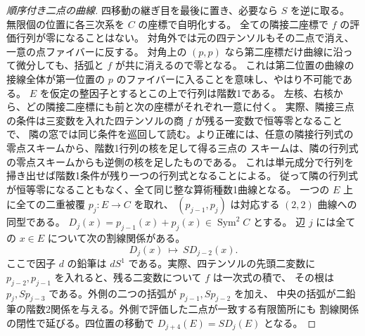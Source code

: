 \begin{proof}[順序付き二点の曲線]
四移動の継ぎ目を最後に置き、必要なら $S$ を逆に取る。
無限個の位置に各三次系を $C$ の座標で自明化する。
全ての隣接二座標で $f$ の評価行列が零になることはない。
対角外では元の四テンソルもその二点で消え、一意の点ファイバーに反する。
対角上の $(p,p)$ なら第二座標だけ曲線に沿って微分しても、括弧と $f$ が共に消えるので零となる。
これは第二位置の曲線の接線全体が第一位置の $p$ のファイバーに入ることを意味し、やはり不可能である。
$E$ を仮定の整因子とするとこの上で行列は階数1である。
左核、右核から、どの隣接二座標にも前と次の座標がそれぞれ一意に付く。
実際、隣接三点の条件は三変数を入れた四テンソルの商 $f$ が残る一変数で恒等零となることで、
隣の窓では同じ条件を巡回して読む。より正確には、任意の隣接行列式の零点スキームから、階数1行列の核を足して得る三点の
スキームは、隣の行列式の零点スキームからも逆側の核を足したものである。
これは単元成分で行列を掃き出せば階数1条件が残り一つの行列式となることによる。
従って隣の行列式が恒等零になることもなく、全て同じ整な算術種数1曲線となる。
一つの $E$ 上に全ての二重被覆 $p_j:E\to C$ を取れ、
$(p_{j-1},p_j)$ は対応する $(2,2)$ 曲線への同型である。
$D_j(x)=p_{j-1}(x)+p_j(x)\in\operatorname{Sym}^2C$ とする。
辺 $j$ には全ての $x\in E$ について次の割線関係がある。
\[
            D_j(x)\ \longmapsto\ S D_{j-2}(x).
\]
ここで因子 $d$ の鉛筆は $d S^1$ である。実際、四テンソルの先頭二変数に
$p_{j-2},p_{j-1}$ を入れると、残る二変数について $f$ は一次式の積で、
その根は $p_j,S p_{j-3}$ である。外側の二つの括弧が $p_{j-1},S p_{j-2}$ を加え、
中央の括弧が二鉛筆の階数2関係を与える。外側で評価した二点が一致する有限箇所にも
割線関係の閉性で延びる。四位置の移動で $D_{j+4}(E)=S D_j(E)$ となる。

\end{proof}
